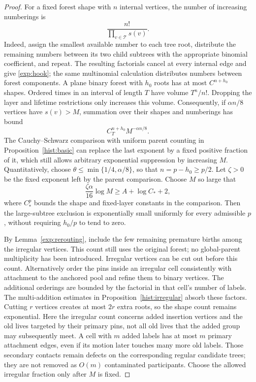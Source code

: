 \begin{proof}
For a fixed forest shape with $n$ internal vertices, the number of increasing
numberings is
\begin{equation}
\label{exp:hook}
 \frac{n!}{\prod_{v\in\mathcal T}s(v)}.
\end{equation}
Indeed, assign the smallest available number to each tree root, distribute
the remaining numbers between its two child subtrees with the appropriate
binomial coefficient, and repeat.  The resulting factorials cancel at
every internal edge and give \eqref{exp:hook}; the same multinomial
calculation distributes numbers between forest components.  A plane binary
forest with $h_0$ roots has at most $C^{n+h_0}$ shapes.  Ordered times in an
interval of length $T$ have volume $T^n/n!$.  Dropping the layer and lifetime
restrictions only increases this volume.  Consequently, if $\alpha n/8$
vertices have $s(v)>M$, summation over their shapes and numberings has bound
\begin{equation}
\label{exp:large-subtrees}
 C_T^{n+h_0} M^{-\alpha n/8}.
\end{equation}
The Cauchy--Schwarz comparison with uniform parent counting in
Proposition~\ref{hist:basic} can replace the last exponent by a fixed positive
fraction of it, which still allows arbitrary exponential suppression by
increasing $M$.  Quantitatively, choose
$\theta\le\min\{1/4,\alpha/8\}$, so that $n=p-h_0\ge p/2$.
Let $\zeta>0$ be the fixed exponent left by the parent comparison.
Choose $M$ so large that
\[
 \frac{\zeta\alpha}{16}\log M
 \ge A+\log C_*+2,
\]
where $C_*^p$ bounds the shape and fixed-layer constants in the comparison.
Then the large-subtree exclusion is exponentially small uniformly for
every admissible $p$, without requiring $h_0/p$ to tend to zero.

By Lemma~\ref{exp:rerouting}, include the few remaining premature births
among the irregular vertices.  This count still uses the original forest;
no global-parent multiplicity has been introduced.  Irregular vertices can
be cut out before this count.  Alternatively order
the pins inside an irregular cell consistently with attachment to the
anchored pool and refine them to binary vertices.  The additional orderings
are bounded by the factorial in that cell's number of labels.  The
multi-addition estimates in Proposition~\ref{hist:irregular} absorb these factors.
Cutting $r$ vertices creates at most $2r$ extra roots, so the shape count
remains exponential.
Here the irregular count concerns added insertion vertices and the old
lives targeted by their primary pins, not all old lives that the added
group may subsequently meet.  A cell with $m$ added labels has at most
$m$ primary attachment edges, even if its motion later touches many more
old labels.  Those secondary contacts remain defects on the corresponding
regular candidate trees; they are not removed as $O(m)$ contaminated
participants.  Choose the allowed irregular fraction only after $M$
is fixed.


\end{proof}
